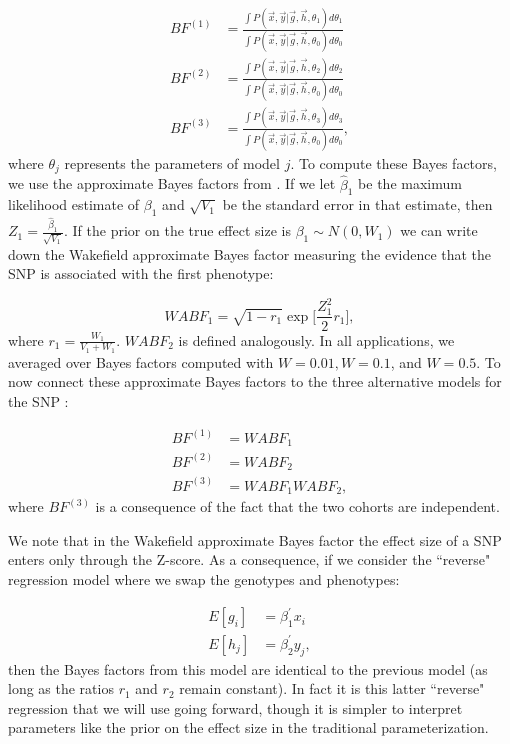 \documentclass[11pt,titlepage]{article}
\begin{document}
\begin{align}
BF^{(1)}  &= \frac{\int P(\vec x, \vec y | \vec g, \vec h, \theta_1) d \theta_1}{\int P(\vec x, \vec y | \vec g, \vec h, \theta_0) d \theta_0} \\
BF^{(2)}  &= \frac{\int P(\vec x, \vec y| \vec g, \vec h, \theta_2) d \theta_2}{\int P(\vec x, \vec y | \vec g, \vec h,\theta_0) d \theta_0} \\
BF^{(3)}  &= \frac{\int P(\vec x, \vec y | \vec g,  \vec h,\theta_3) d \theta_3}{\int P(\vec x, \vec y | \vec g,\vec h, \theta_0) d \theta_0},
\end{align}
\noindent where $\theta_j$ represents the parameters of model $j$. To compute these Bayes factors, we use the approximate Bayes factors from \citet{Wakefield:2008hc}. If we let $\hat \beta_1$ be the maximum likelihood estimate of $\beta_1$ and $\sqrt{V_1}$ be the standard error in that estimate, then $Z_1 = \frac{\hat \beta_1}{\sqrt{V_1}}$. If the prior on the true effect size is $\beta_1 \sim N(0, W_1)$ we can write down the Wakefield approximate Bayes factor measuring the evidence that the SNP is associated with the first phenotype:

\begin{equation}
WABF_1 = \sqrt{1-r_1} \exp \bigg[ \frac{Z_1^2}{2} r_1 \bigg],
\end{equation}
\noindent where $r_1 = \frac{W_1}{V_1+W_1}$. $WABF_2$ is defined analogously. In all applications, we averaged over Bayes factors computed with $W = 0.01, W = 0.1$, and  $W = 0.5$. To now connect these approximate Bayes factors to the three alternative models for the SNP \citep{Giambartolomei:2014aa}:

\begin{align}
BF^{(1)}  &= WABF_1 \\
BF^{(2)}  &= WABF_2 \\
BF^{(3)}  &= WABF_1 WABF_2,
\end{align}
\noindent where $BF^{(3)}$ is a consequence of the fact that the two cohorts are independent. 

We note that in the Wakefield approximate Bayes factor the effect size of a SNP enters only through the Z-score. As a consequence, if we consider the ``reverse" regression model where we swap the genotypes and phenotypes:

\begin{align}
E[g_i] &= \beta_1^\prime x_i \\
E[h_j] &= \beta_2^{\prime} y_j,
\end{align}
\noindent then the Bayes factors from this model are identical to the previous model (as long as the ratios $r_1$ and $r_2$ remain constant). In fact it is this latter ``reverse" regression that we will use going forward, though it is simpler to interpret parameters like the prior on the effect size in the traditional parameterization. 
\end{document}
